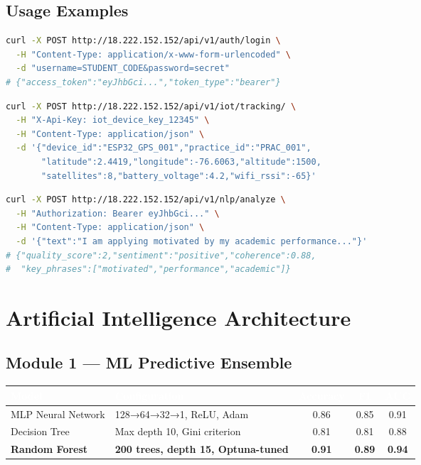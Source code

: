 \documentclass[12pt,a4paper,twoside]{report}
\begin{document}
\section{Usage Examples}

\begin{lstlisting}[language=bash,caption={POST /auth/login — JWT Authentication}]
curl -X POST http://18.222.152.152/api/v1/auth/login \
  -H "Content-Type: application/x-www-form-urlencoded" \
  -d "username=STUDENT_CODE&password=secret"
# {"access_token":"eyJhbGci...","token_type":"bearer"}
\end{lstlisting}

\begin{lstlisting}[language=bash,caption={POST /iot/tracking/ — GPS data from ESP32}]
curl -X POST http://18.222.152.152/api/v1/iot/tracking/ \
  -H "X-Api-Key: iot_device_key_12345" \
  -H "Content-Type: application/json" \
  -d '{"device_id":"ESP32_GPS_001","practice_id":"PRAC_001",
       "latitude":2.4419,"longitude":-76.6063,"altitude":1500,
       "satellites":8,"battery_voltage":4.2,"wifi_rssi":-65}'
\end{lstlisting}

\begin{lstlisting}[language=bash,caption={POST /nlp/analyze — DistilBERT Letter Analysis}]
curl -X POST http://18.222.152.152/api/v1/nlp/analyze \
  -H "Authorization: Bearer eyJhbGci..." \
  -H "Content-Type: application/json" \
  -d '{"text":"I am applying motivated by my academic performance..."}'
# {"quality_score":2,"sentiment":"positive","coherence":0.88,
#  "key_phrases":["motivated","performance","academic"]}
\end{lstlisting}

\chapter{Artificial Intelligence Architecture}

\section{Module 1 — ML Predictive Ensemble}

\begin{center}
\begin{tabularx}{\textwidth}{|l|X|c|c|c|}
\hline
\rowcolor{tableHdr}
\textcolor{white}{\textbf{Model}} & \textcolor{white}{\textbf{Configuration}} &
\textcolor{white}{\textbf{Accuracy}} & \textcolor{white}{\textbf{F1}} & \textcolor{white}{\textbf{AUC}} \\
\hline
\rowcolor{rowOdd}MLP Neural Network & 128→64→32→1, ReLU, Adam & 0.86 & 0.85 & 0.91 \\
\hline\rowcolor{rowEven}Decision Tree & Max depth 10, Gini criterion & 0.81 & 0.81 & 0.88 \\
\hline\rowcolor{rowOdd}\textbf{Random Forest} & \textbf{200 trees, depth 15, Optuna-tuned} & \textbf{0.91} & \textbf{0.89} & \textbf{0.94} \\
\hline
\end{tabularx}
\end{center}
\end{document}
